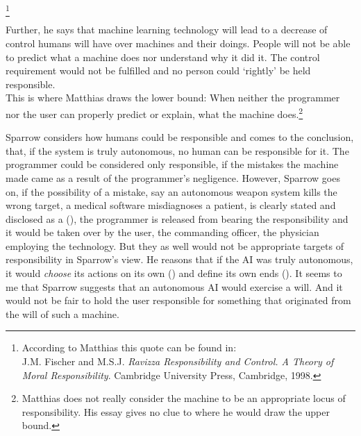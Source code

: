 \documentclass{article}
\begin{document}
\footnote{According to Matthias this quote can be found in:\\
J.M. Fischer and M.S.J. \textit{Ravizza Responsibility and Control. A Theory of
Moral Responsibility}. Cambridge University Press, Cambridge, 1998.}

Further, he says that machine learning technology will lead to a decrease of
control humans will have over machines and their doings. People will not be able
to predict what a machine does nor understand why it did it. The control
requirement would not be fulfilled and no person could `rightly' be held
responsible.\\ 

This is where Matthias draws the lower bound: When neither the programmer nor
the user can properly predict or explain, what the machine
does.\footnote{Matthias does not really consider the machine to be an
	appropriate locus of responsibility. His essay gives no clue to where he
would draw the upper bound.}


Sparrow considers how humans could be responsible and comes to the conclusion,
that, if the system is truly autonomous, no human can be responsible for it. The
programmer could be considered only responsible, if the mistakes the machine
made came as a result of the programmer's negligence. However, Sparrow goes on,
if the possibility of a mistake, say an autonomous weapon system kills the wrong
target, a medical software misdiagnoses a patient, is clearly stated and
disclosed as a  (\cite[p. 69]{sparrow2007killer}),
the programmer is released from bearing the responsibility and it would be taken
over by the user, the commanding officer, the physician employing the
technology. But they as well would not be appropriate targets of responsibility
in Sparrow's view. He reasons that if the AI was truly autonomous, it would
\textit{choose} its actions on its own (\cite[p. 70]{sparrow2007killer}) and
define its own ends (\cite[p. 74]{sparrow2007killer}). It
seems to me that Sparrow suggests that an autonomous AI would exercise a will.
And it would not be fair to hold the user responsible for something that
originated from the will of such a machine.
\end{document}
